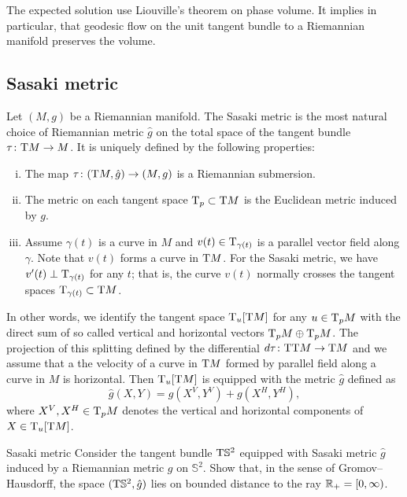 The expected solution use Liouville's theorem on phase volume.
It implies in particular, that geodesic flow on the unit tangent bundle to a Riemannian manifold preserves the volume.


\subsection*{Sasaki metric}

Let $(M,g)$ be a Riemannian manifold.
The Sasaki metric is the most natural choice of Riemannian metric $\hat g$ on the total space of the tangent bundle $\tau\colon\mathrm{T} M\to M$.
It is uniquely defined by the following properties:
\begin{enumerate}[(i)]
\item The map $\tau\colon(\mathrm{T} M,\hat g)\to (M,g)$ is a Riemannian submersion.
\item The metric on each tangent space $\mathrm{T}_p\subset \mathrm{T} M$ is the Euclidean metric induced by $g$.
\item Assume $\gamma(t)$ is a curve in $M$ and $v(t)\in\mathrm{T}_{\gamma(t)}$ is a parallel vector field along $\gamma$. 
Note that $v(t)$ forms a curve in $\mathrm{T} M$.
For the Sasaki metric, we have $v'(t)\perp \mathrm{T}_{\gamma(t)}$ for any $t$;
that is, the curve $v(t)$ normally crosses the tangent spaces $\mathrm{T}_{\gamma(t)}\subset \mathrm{T} M$.
\end{enumerate}

In other words, we identify the tangent space 
$\mathrm{T}_u[\mathrm{T} M]$ for any $u\in \mathrm{T}_p M$ with the direct sum of so called vertical and horizontal vectors $\mathrm{T}_p M\oplus \mathrm{T}_p M$.
The projection of this splitting defined by the differential $d\tau\colon\mathrm{T}\mathrm{T} M\to \mathrm{T} M$
and we assume that a the velocity of a curve in $\mathrm{T} M$ formed by parallel field along a curve in $M$ is horizontal.
Then $\mathrm{T}_u[\mathrm{T} M]$ is equipped with the metric $\hat g$ defined as 
\[\hat g(X,Y)=g(X^V,Y^V)+g(X^H,Y^H),\]
where $X^V,X^H\in\mathrm{T}_pM$ denotes the vertical and horizontal components of $X\in\mathrm{T}_u[\mathrm{T} M]$.



\begin{pr}{}{Sasaki metric}\label{pr:Sasaki metric}
Consider the tangent bundle $\mathrm{T} \mathbb{S}^2$ 
equipped with Sasaki metric $\hat g$ induced by a Riemannian metric $g$ on $\mathbb{S}^2$.
Show that, in the sense of Gromov--Hausdorff,
the space $(\mathrm{T} \mathbb{S}^2, \hat g)$ lies on bounded distance to the ray $\mathbb{R}_+=[0,\infty)$.
\end{pr}


